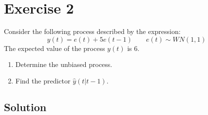 \section{Exercise 2}

Consider the following process described by the expression:
\[y(t)=e(t)+5e(t-1)\qquad e(t)\sim WN(1,1)\]
The expected value of the process $y(t)$ is 6. 
\begin{enumerate}
    \item Determine the unbiased process.
    \item Find the predictor $\hat{y}(t|t-1)$. 
\end{enumerate}

\subsection*{Solution}
